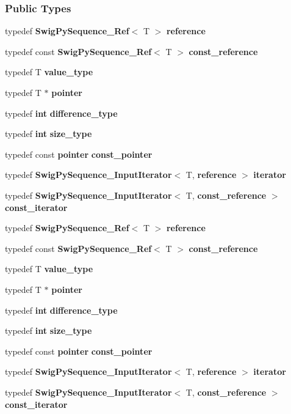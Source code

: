 \subsubsection*{Public Types}
\begin{DoxyCompactItemize}
\item 
typedef {\bf Swig\+Py\+Sequence\+\_\+\+Ref}$<$ T $>$ {\bf reference}
\item 
typedef const {\bf Swig\+Py\+Sequence\+\_\+\+Ref}$<$ T $>$ {\bf const\+\_\+reference}
\item 
typedef T {\bf value\+\_\+type}
\item 
typedef T $\ast$ {\bf pointer}
\item 
typedef {\bf int} {\bf difference\+\_\+type}
\item 
typedef {\bf int} {\bf size\+\_\+type}
\item 
typedef const {\bf pointer} {\bf const\+\_\+pointer}
\item 
typedef {\bf Swig\+Py\+Sequence\+\_\+\+Input\+Iterator}$<$ T, {\bf reference} $>$ {\bf iterator}
\item 
typedef {\bf Swig\+Py\+Sequence\+\_\+\+Input\+Iterator}$<$ T, {\bf const\+\_\+reference} $>$ {\bf const\+\_\+iterator}
\item 
typedef {\bf Swig\+Py\+Sequence\+\_\+\+Ref}$<$ T $>$ {\bf reference}
\item 
typedef const {\bf Swig\+Py\+Sequence\+\_\+\+Ref}$<$ T $>$ {\bf const\+\_\+reference}
\item 
typedef T {\bf value\+\_\+type}
\item 
typedef T $\ast$ {\bf pointer}
\item 
typedef {\bf int} {\bf difference\+\_\+type}
\item 
typedef {\bf int} {\bf size\+\_\+type}
\item 
typedef const {\bf pointer} {\bf const\+\_\+pointer}
\item 
typedef {\bf Swig\+Py\+Sequence\+\_\+\+Input\+Iterator}$<$ T, {\bf reference} $>$ {\bf iterator}
\item 
typedef {\bf Swig\+Py\+Sequence\+\_\+\+Input\+Iterator}$<$ T, {\bf const\+\_\+reference} $>$ {\bf const\+\_\+iterator}
\end{DoxyCompactItemize}
